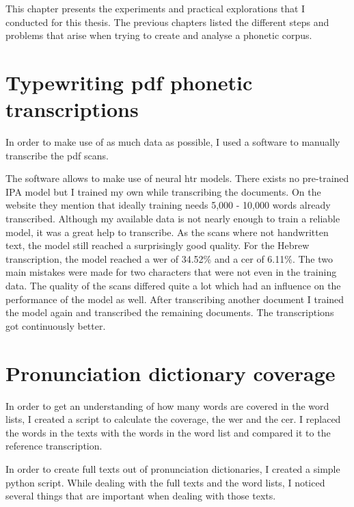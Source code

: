 
\label{chap:exp}
This chapter presents the experiments and practical explorations that I conducted for this thesis. The previous chapters listed the different steps and problems that arise when trying to create and analyse a phonetic corpus. 

\section{Typewriting pdf phonetic transcriptions}
In order to make use of as much data as possible, I used a software to manually transcribe the pdf scans.

The software allows to make use of neural \ac{htr} models. There exists no pre-trained IPA model but I trained my own while transcribing the documents. On the website they mention that ideally training needs 5,000 - 10,000 words already transcribed. Although my available data is not nearly enough to train a reliable model, it was a great help to transcribe. As the scans where not handwritten text, the model still reached a surprisingly good quality. For the Hebrew transcription, the model reached a \ac{wer} of 34.52\% and a \ac{cer} of 6.11\%. The two main mistakes were made for two characters that were not even in the training data. The quality of the scans differed quite a lot which had an influence on the performance of the model as well. After transcribing another document I trained the model again and transcribed the remaining documents. The transcriptions got continuously better.


\section{Pronunciation dictionary coverage}
In order to get an understanding of how many words are covered in the word lists, I created a script to calculate the coverage, the \ac{wer} and the \ac{cer}. I replaced the words in the texts with the words in the word list and compared it to the reference transcription.


In order to create full texts out of pronunciation dictionaries, I created a simple python script. While dealing with the full texts and the word lists, I noticed several things that are important when dealing with those texts.

